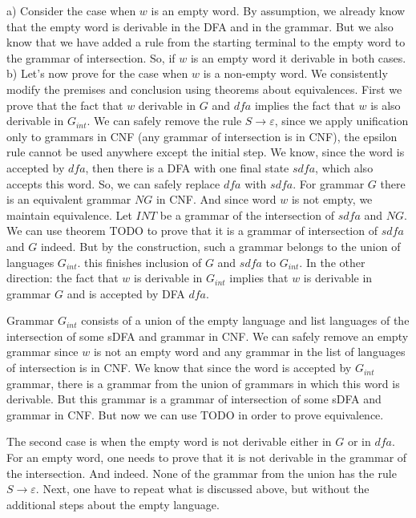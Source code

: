 a) Consider the case when $w$ is an empty word.
By assumption, we already know that the empty word is derivable in the DFA and in the grammar. But we also know that we have added a rule from the starting terminal to the empty word to the grammar of intersection. So, if $w$ is an empty word it derivable in both cases.
b) Let's now prove for the case when $w$ is a non-empty word.
We consistently modify the premises and conclusion using theorems about equivalences. First we prove that the fact that $w$ derivable in $G$ and $dfa$ implies the fact that $w$ is also derivable in $G_{int}$. We can safely remove the rule $S \to \varepsilon$, since we apply unification only to grammars in CNF (any grammar of intersection is in CNF), the epsilon rule cannot be used anywhere except the initial step.
We know, since the word is accepted by $dfa$, then there is a DFA with one final state $sdfa$, which also accepts this word. So, we can safely replace $dfa$ with $sdfa$. 
For grammar $G$ there is an equivalent grammar $NG$ in CNF. And since word $w$ is not empty, we maintain equivalence.
Let $INT$ be a grammar of the intersection of $sdfa$ and $NG$. We can use theorem TODO to prove that it is a grammar of intersection of $sdfa$ and $G$ indeed. 
But by the construction, such a grammar belongs to the union of languages $G_{int}$. this finishes inclusion of $G$ and $sdfa$ to $G_{int}$.
In the other direction: the fact that $w$ is derivable in $G_{int}$ implies that $w$ is derivable in grammar $G$ and is accepted by DFA $dfa$. 

Grammar $G_{int}$ consists of a union of the empty language and list languages of the intersection of some sDFA and grammar in CNF. We can safely remove an empty grammar since $w$ is not an empty word and any grammar in the list of languages of intersection is in CNF.
We know that since the word is accepted by $G_{int}$ grammar, there is a grammar from the union of grammars in which this word is derivable.
But this grammar is a grammar of intersection of some sDFA and grammar in CNF. But now we can use TODO in order to prove equivalence.

The second case is when the empty word is not derivable either in $G$ or in $dfa$.
For an empty word, one needs to prove that it is not derivable in the grammar of the intersection. 
And indeed. None of the grammar from the union has the rule $S \to \varepsilon$. 
Next, one have to repeat what is discussed above, but without the additional steps about the empty language.